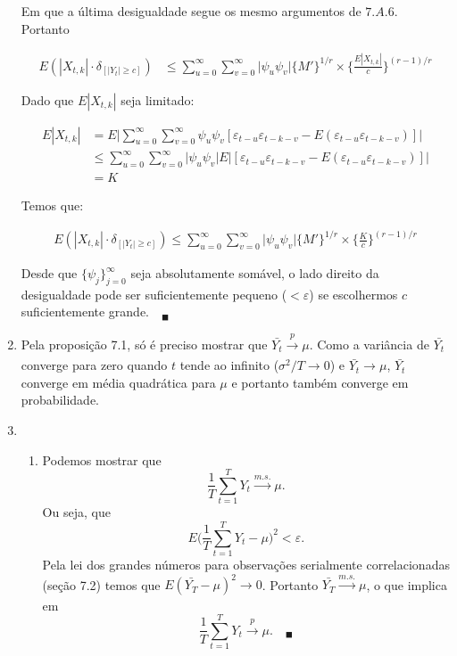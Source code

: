 \begin{enumerate}
	Em que a última desigualdade segue os mesmo argumentos de $7.A.6$. Portanto
	
	
	\begin{align*}
		E(|X_{t,k}|\cdot\delta_{[|Y_t|\geq c]})&\leq\sum\limits_{u=0}^{\infty}\sum\limits_{v=0}^{\infty}\bigg|\psi_u\psi_v\bigg|\bigg\{M'\bigg\}^{1/r}\times \bigg\{\frac{E|X_{t,k}|}{c}\bigg\}^{(r-1)/r}
	\end{align*}
	
	Dado que $E|X_{t,k}|$ seja limitado:
	
	\begin{align*}
		E|X_{t,k}|&=E\bigg|\sum\limits_{u=0}^{\infty}\sum\limits_{v=0}^{\infty}\psi_u\psi_v[\varepsilon_{t-u}\varepsilon_{t-k-v}-E(\varepsilon_{t-u}\varepsilon_{t-k-v})]\bigg|\\
		&\leq\sum\limits_{u=0}^{\infty}\sum\limits_{v=0}^{\infty}\bigg|\psi_u\psi_v\bigg|E\bigg|[\varepsilon_{t-u}\varepsilon_{t-k-v}-E(\varepsilon_{t-u}\varepsilon_{t-k-v})]\bigg|\\
		&=K
	\end{align*}
	 
	 Temos que:
	 
	 \begin{align*}
	 	E(|X_{t,k}|\cdot\delta_{[|Y_t|\geq c]})\leq\sum\limits_{u=0}^{\infty}\sum\limits_{v=0}^{\infty}\bigg|\psi_u\psi_v\bigg|\bigg\{M'\bigg\}^{1/r}\times \bigg\{\frac{K}{c}\bigg\}^{(r-1)/r}
	 \end{align*}
	 
	 Desde que $\{\psi_j\}_{j=0}^{\infty}$ seja absolutamente somável, o lado direito da desigualdade pode ser suficientemente pequeno ($<\varepsilon$) se escolhermos $c$ suficientemente grande.$\quad_{\blacksquare}$
	 
	 \item[\fbox{7.6}]
	 
	 Pela proposição 7.1, só é preciso mostrar que $\bar{Y_t}\xrightarrow[]{p}\mu$.
	 Como a variância de $\bar{Y_t}$ converge para zero quando $t$ tende ao infinito ($\sigma^2/T\rightarrow 0$) e $\bar{Y_t}\rightarrow\mu$, $\bar{Y_t}$ converge em média quadrática para $\mu$ e portanto também converge em probabilidade. 
	 
	 
	 \item[\fbox{7.7}]
	 
	 \begin{enumerate}
	 	\item %
	 	
	 	Podemos mostrar que $$\frac{1}{T}\sum\limits_{t=1}^TY_t\xrightarrow[]{m.s.}\mu.$$
	 	Ou seja, que $$E\bigg(\frac{1}{T}\sum\limits_{t=1}^TY_t-\mu\bigg)^2<\varepsilon.$$
	 	Pela lei dos grandes números para observações serialmente correlacionadas (seção 7.2) temos que $E(\bar{Y_T}-\mu)^2\rightarrow0$. Portanto $\bar{Y_T}\xrightarrow[]{m.s.}\mu$, o que implica em $$\frac{1}{T}\sum\limits_{t=1}^TY_t\xrightarrow[]{p}\mu.\quad_{\blacksquare}$$
	 	

\end{enumerate}
\end{enumerate}
